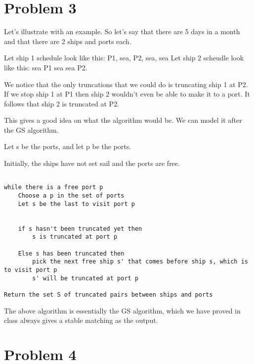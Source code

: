 \documentclass{article}
\begin{document}
\pagebreak
\section{Problem 3}

Let's illustrate with an example. So let's say that there are 5 days in a month and that there are 2 ships and ports each. 

Let ship 1 schedule look like this: P1, sea, P2, sea, sea
Let ship 2 scheudle look like this: sea P1 sea sea P2. 
\vspace{1mm}

We notice that the only truncations that we could do is truncating ship 1 at P2. If we stop ship 1 at P1
then ship 2 wouldn't even be able to make it to a port. It follows that ship 2 is truncated at P2. 
\vspace{1mm}

This gives a good idea on what the algorithm would be. We can model it after the GS algorithm. 
\vspace{1mm}

Let s be the ports, and let p be the ports. 
\vspace{1mm}

Initially, the ships have not set sail and the ports are free. 
\vspace{1mm}


\begin{lstlisting}

while there is a free port p
    Choose a p in the set of ports 
    Let s be the last to visit port p 
    

    if s hasn't been truncated yet then 
        s is truncated at port p 

    Else s has been truncated then  
        pick the next free ship s' that comes before ship s, which is to visit port p
        s' will be truncated at port p
        
Return the set S of truncated pairs between ships and ports

\end{lstlisting}

The above algorithm is essentially the GS algorithm, which we have proved in class always gives a stable matching as the output. 



\pagebreak
\section{Problem 4}
\end{document}
